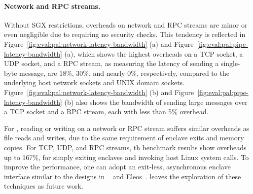 






\paragraph{Network and RPC streams.}
Without SGX restrictions,
\thehostabi{} overheads on network and RPC streams
are minor or even negligible
due to requiring no security checks.
This tendency is reflected in
Figure~\ref{fig:eval:pal:network-latency-bandwidth} (a)
and
Figure~\ref{fig:eval:pal:pipe-latency-bandwidth} (a),
which shows the highest overheads on a TCP socket, a UDP socket, and a RPC stream,
as measuring the latency of sending a single-byte message,
are \roughly{}18\%, \roughly{}30\%,
and nearly 0\%, respectively, compared to the underlying host network sockets and UNIX domain sockets.
Figure~\ref{fig:eval:pal:network-latency-bandwidth} (b) and Figure~\ref{fig:eval:pal:pipe-latency-bandwidth} (b) also shows the bandwidth of sending large messages over a TCP socket and a RPC stream, each with less than 5\% overhead.


For \sgx{}, reading or writing on a network or RPC stream
suffers similar overheads as file reads and writes,
due to the same requirement of enclave exits and memory copies.
For TCP, UDP, and RPC streams,
th benchmark results show overheads up to 167\%,
for simply exiting enclaves
and invoking host Linux system calls.
To improve the performance, one can adopt an exit-less, asynchronous enclave interface
similar to the designs in \scone{}~\cite{osdi16scone} and Eleos~\cite{orenbach17eleos}.
\graphene{} leaves the exploration of these techniques as future work.




